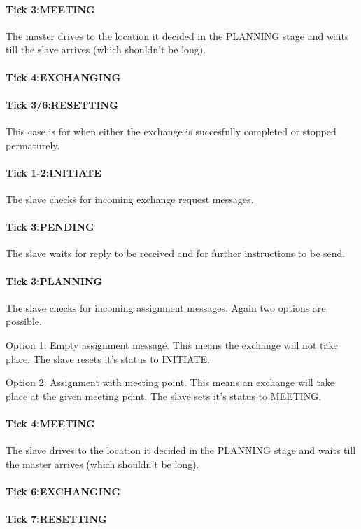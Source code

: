 \documentclass[../main.tex]{subfiles}
\begin{document}
\paragraph{Tick 3:MEETING}
The master drives to the location it decided in the PLANNING stage and waits till the slave arrives (which shouldn't be long). 

\paragraph{Tick 4:EXCHANGING}
\paragraph{Tick 3/6:RESETTING}
This case is for when either the exchange is succesfully completed or stopped permaturely.
\paragraph{Tick 1-2:INITIATE}
The slave checks for incoming exchange request messages.
\paragraph{Tick 3:PENDING}
The slave waits for reply to be received and for further instructions to be send.
\paragraph{Tick 3:PLANNING}
The slave checks for incoming assignment messages. 
Again two options are possible.

Option 1: Empty assignment message.
This means the exchange will not take place.
The slave resets it's status to INITIATE.

Option 2: Assignment with meeting point.
This means an exchange will take place at the given meeting point.
The slave sets it's status to MEETING.
\paragraph{Tick 4:MEETING}
The slave drives to the location it decided in the PLANNING stage and waits till the master arrives (which shouldn't be long). 
\paragraph{Tick 6:EXCHANGING}
\paragraph{Tick 7:RESETTING}
\end{document}
